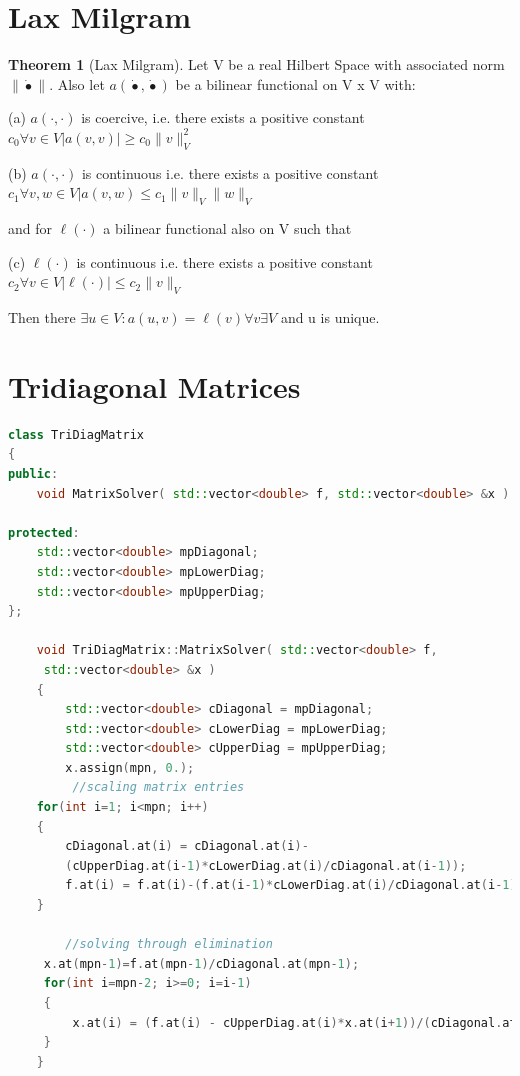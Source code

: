 \documentclass{uonmathreport}
\theoremstyle{definition}
\theoremstyle{problem}
\theoremstyle{theorem}
\newtheorem{theorem}{Theorem}[section]
\begin{document}
\appendix

\section{Lax Milgram} \label{app:LM}

\begin{theorem}[Lax Milgram]
Let V be a real Hilbert Space with associated norm $\|\dot{•}\|$. Also let $a(\dot{•}, \dot{•})$ be a bilinear functional on V x V with:

(a) $a(\cdot, \cdot)$ is coercive, i.e. there exists a positive constant $c_0 \forall v \in V |a(v, v)|  \geq c_0 \|v\|^2_V$ 

(b) $a(\cdot, \cdot)$ is continuous i.e. there exists a positive constant $c_1 \forall v, w \in V |a(v, w) \leq c_1 \|v\|_V \|w\|_V$ 

and for $\ell(\cdot)$ a bilinear functional also on V such that 

(c) $\ell(\cdot)$ is continuous i.e. there exists a positive constant $c_2 \forall v \in V |\ell(\cdot)|  \leq c_2 \|v\|_V$

Then there $\exists u \in V: a(u, v) = \ell(v) \forall v \exists V$ and u is unique.
\end{theorem}

\section{Tridiagonal Matrices} \label{app:Tridiag}

\begin{lstlisting}[language=C++]
class TriDiagMatrix
{
public:
    void MatrixSolver( std::vector<double> f, std::vector<double> &x )
    
protected:
    std::vector<double> mpDiagonal;
    std::vector<double> mpLowerDiag;
    std::vector<double> mpUpperDiag;
};
    
    void TriDiagMatrix::MatrixSolver( std::vector<double> f,
     std::vector<double> &x )
    {
        std::vector<double> cDiagonal = mpDiagonal;
        std::vector<double> cLowerDiag = mpLowerDiag;
        std::vector<double> cUpperDiag = mpUpperDiag;
        x.assign(mpn, 0.);
         //scaling matrix entries
    for(int i=1; i<mpn; i++)
    {
        cDiagonal.at(i) = cDiagonal.at(i)-
        (cUpperDiag.at(i-1)*cLowerDiag.at(i)/cDiagonal.at(i-1));
        f.at(i) = f.at(i)-(f.at(i-1)*cLowerDiag.at(i)/cDiagonal.at(i-1));
    }

        //solving through elimination
     x.at(mpn-1)=f.at(mpn-1)/cDiagonal.at(mpn-1);
     for(int i=mpn-2; i>=0; i=i-1)
     {
         x.at(i) = (f.at(i) - cUpperDiag.at(i)*x.at(i+1))/(cDiagonal.at(i));
     }
    }

\end{lstlisting}
\end{document}
